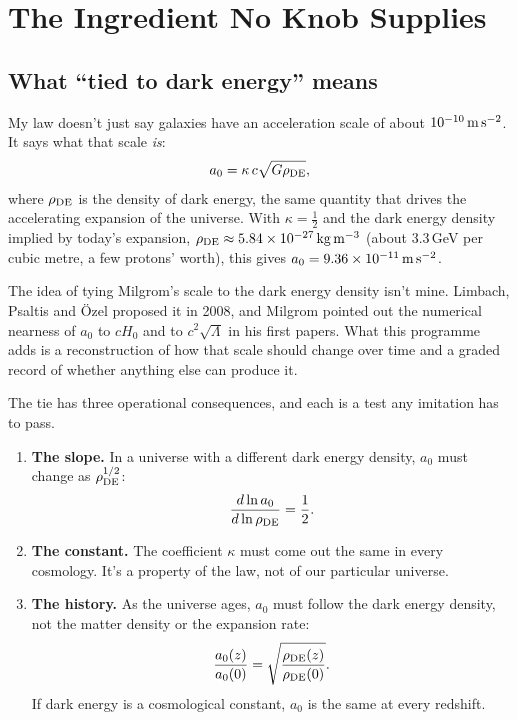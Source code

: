 \chapter{The Ingredient No Knob Supplies}




\section{What ``tied to dark energy'' means}

My law doesn't just say galaxies have an acceleration scale of about $10^{-10}\,\mathrm{m\,s^{-2}}$. It says what that scale \emph{is}:
\begin{equation}
a_0=\kappa\,c\sqrt{G\rho_{\rm DE}},
\end{equation}
where $\rho_{\rm DE}$ is the density of dark energy, the same quantity that drives the accelerating expansion of the universe. With $\kappa=\tfrac12$ and the dark energy density implied by today's expansion, $\rho_{\rm DE}\approx5.84\times10^{-27}\,\mathrm{kg\,m^{-3}}$ (about 3.3\,GeV per cubic metre, a few protons' worth), this gives $a_0=9.36\times10^{-11}\,\mathrm{m\,s^{-2}}$.

The idea of tying Milgrom's scale to the dark energy density isn't mine. Limbach, Psaltis and \"Ozel proposed it in 2008, and Milgrom pointed out the numerical nearness of $a_0$ to $cH_0$ and to $c^2\sqrt\Lambda$ in his first papers. What this programme adds is a reconstruction of how that scale should change over time and a graded record of whether anything else can produce it.

The tie has three operational consequences, and each is a test any imitation has to pass.
\begin{enumerate}
\item \textbf{The slope.} In a universe with a different dark energy density, $a_0$ must change as $\rho_{\rm DE}^{1/2}$:
\begin{equation}
\frac{d\ln a_0}{d\ln\rho_{\rm DE}}=\frac12.
\end{equation}
\item \textbf{The constant.} The coefficient $\kappa$ must come out the same in every cosmology. It's a property of the law, not of our particular universe.
\item \textbf{The history.} As the universe ages, $a_0$ must follow the dark energy density, not the matter density or the expansion rate:
\begin{equation}
\frac{a_0(z)}{a_0(0)}=\sqrt{\frac{\rho_{\rm DE}(z)}{\rho_{\rm DE}(0)}}.
\end{equation}
If dark energy is a cosmological constant, $a_0$ is the same at every redshift.
\end{enumerate}

